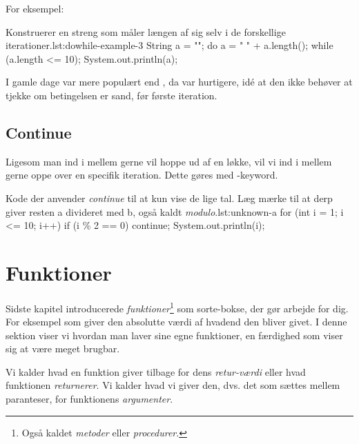 		For eksempel:

		\begin{JavaCode}{Konstruerer en streng som måler længen af sig selv i de forskellige iterationer.}{lst:dowhile-example-3}
			String a = "";
			do {
				a = " " + a.length();
			} while (a.length <= 10);
			System.out.println(a);
		\end{JavaCode}

        I gamle dage var  mere populært end
        , da  var
        hurtigere, idé at den ikke behøver at tjekke om betingelsen er
        sand, før første iteration.

	\subsection{Continue}

        Ligesom man ind i mellem gerne vil hoppe ud af en løkke, vil
        vi ind i mellem gerne oppe over en specifik iteration. Dette
        gøres med -keyword.

        \begin{JavaCode}{Kode der anvender \emph{continue} til at kun vise de lige tal. Læg mærke til at derp giver resten a divideret med b, også kaldt \emph{modulo}.}{lst:unknown-a}
			for (int i = 1; i <= 10; i++) {
				if (i \% 2 == 0)  continue;
				System.out.println(i);
			}
		\end{JavaCode}


\section{Funktioner}

    Sidste kapitel introducerede \emph{funktioner}\footnote{Også
    kaldet \emph{metoder} eller \emph{procedurer}.} som sorte-bokse,
    der gør arbejde for dig. For eksempel  som
    giver den absolutte værdi af hvadend den bliver givet. I denne
    sektion viser vi hvordan man laver sine egne funktioner, en
    færdighed som viser sig at være meget brugbar.

    Vi kalder hvad en funktion giver tilbage for dens
    \emph{retur-værdi} eller hvad funktionen \emph{returnerer}. Vi
    kalder hvad vi giver den, dvs. det som sættes mellem paranteser,
    for funktionens \emph{argumenter}.

